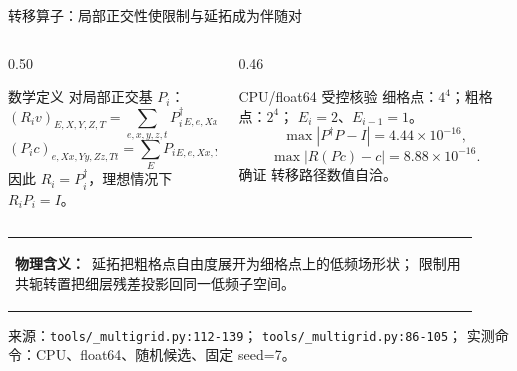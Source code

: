 \documentclass[UTF8,aspectratio=169,11pt]{ctexbeamer}
\newcommand{\source}[1]{%
  \vspace{0.06em}\par{\raggedright\scriptsize\color{muted}来源：#1\par}}
\newcommand{\pathref}[1]{\nolinkurl{#1}}
\newcommand{\verified}{\textcolor{evidence}{确证}}
\newcommand{\goodbox}[1]{\colorbox{evidence!10}{\parbox{0.90\linewidth}{#1}}}
\begin{document}
\begin{frame}[t]{转移算子：局部正交性使限制与延拓成为伴随对}
  \begin{columns}[T,totalwidth=\textwidth]
    \begin{column}{0.50\textwidth}
      \begin{block}{数学定义}
        \small
        对局部正交基 $P_i$：
        \[
          (R_i v)_{E,X,Y,Z,T}
          =\sum_{e,x,y,z,t}
          P_i^\dagger{}_{E,e,Xx,Yy,Zz,Tt}
          v_{e,Xx,Yy,Zz,Tt},
        \]
        \[
          (P_i c)_{e,Xx,Yy,Zz,Tt}
          =\sum_E P_i{}_{E,e,Xx,Yy,Zz,Tt}c_{E,X,Y,Z,T}.
        \]
        因此 $R_i=P_i^\dagger$，理想情况下 $R_iP_i=I$。
      \end{block}
    \end{column}
    \begin{column}{0.46\textwidth}
      \begin{block}{CPU/float64 受控核验}
        \small
        细格点：$4^4$；粗格点：$2^4$；
        $E_i=2$、$E_{i-1}=1$。
        \[
        \max|P^\dagger P-I|=4.44\times10^{-16},
        \]
        \[
        \max|R(Pc)-c|=8.88\times10^{-16}.
        \]
        \verified{} 转移路径数值自洽。
      \end{block}
    \end{column}
  \end{columns}
  \vspace{0.15em}
  \begin{tabular}{@{}p{0.92\linewidth}@{}}
    \goodbox{\textbf{物理含义：}\ 延拓把粗格点自由度展开为细格点上的低频场形状；
    限制用共轭转置把细层残差投影回同一低频子空间。}
  \end{tabular}
  \source{\pathref{tools/_multigrid.py:112-139}；
  \pathref{tools/_multigrid.py:86-105}；
  实测命令：CPU、float64、随机候选、固定 seed=7。}
\end{frame}
\end{document}
